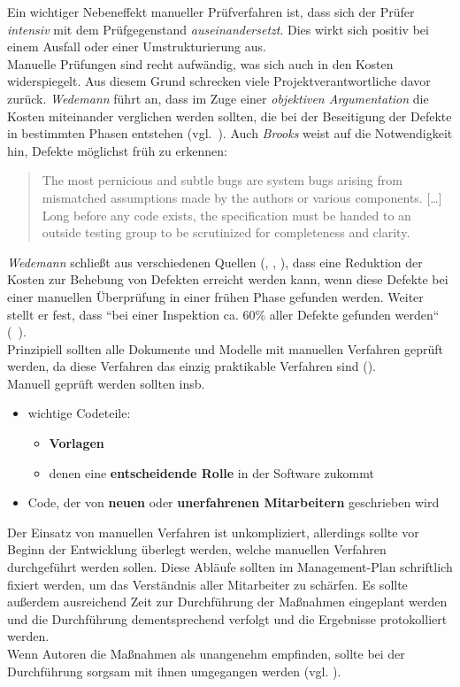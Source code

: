 \noindent
Ein wichtiger Nebeneffekt manueller Prüfverfahren ist, dass sich der Prüfer \textit{intensiv} mit dem Prüfgegenstand \textit{auseinandersetzt}.
Dies wirkt sich positiv bei einem Ausfall oder einer Umstrukturierung aus.\\

\noindent
Manuelle Prüfungen sind recht aufwändig, was sich auch in den Kosten widerspiegelt.
Aus diesem Grund schrecken viele Projektverantwortliche davor zurück. \textit{Wedemann} führt an, dass im Zuge einer \textit{objektiven Argumentation} die Kosten miteinander verglichen werden sollten, die bei der Beseitigung der Defekte in bestimmten Phasen entstehen (vgl.~\cite[16]{Wed09c}).
Auch \textit{Brooks} weist auf die Notwendigkeit hin, Defekte möglichst früh zu erkennen:

\blockquote[{\cite[142]{Bro95}}]{
The most pernicious and subtle bugs are system bugs arising from mismatched assumptions made by the authors or various components. [\ldots] Long before any code exists, the specification must be handed to an outside testing group to be scrutinized for completeness and clarity.
}

\noindent
\textit{Wedemann} schließt aus verschiedenen Quellen (\cite{Rad01}, \cite{Wie02}, \cite{GG93}), dass eine Reduktion der Kosten zur Behebung von Defekten erreicht werden kann, wenn diese Defekte bei einer manuellen Überprüfung in einer frühen Phase gefunden werden.
Weiter stellt er fest,  dass ``bei einer Inspektion ca. 60{\%} aller Defekte gefunden werden`` (~\cite[16]{Wed09c}).\\

\noindent
Prinzipiell sollten alle Dokumente und Modelle mit manuellen Verfahren geprüft werden, da diese Verfahren das einzig praktikable Verfahren sind (\cite[16]{Wed09c}).\\
Manuell geprüft werden sollten insb.

\begin{itemize}
    \item wichtige Codeteile:
    \begin{itemize}
        \item \textbf{Vorlagen}
        \item denen eine \textbf{entscheidende Rolle} in der Software zukommt
    \end{itemize}
    \item Code, der von \textbf{neuen} oder \textbf{unerfahrenen Mitarbeitern} geschrieben wird
\end{itemize}

\noindent
Der Einsatz von manuellen Verfahren ist unkompliziert, allerdings sollte vor Beginn der Entwicklung überlegt werden, welche manuellen Verfahren durchgeführt werden sollen.
Diese Abläufe sollten im Management-Plan schriftlich fixiert werden, um das Verständnis aller Mitarbeiter zu schärfen.
Es sollte außerdem ausreichend Zeit zur Durchführung der Maßnahmen eingeplant werden und die Durchführung dementsprechend verfolgt und die Ergebnisse protokolliert werden.\\
Wenn Autoren die Maßnahmen als unangenehm empfinden, sollte bei der Durchführung sorgsam mit ihnen umgegangen werden (vgl. \cite[17]{Wed09c}).